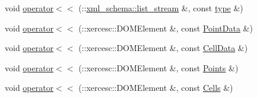 \begin{DoxyCompactItemize}
\item 
void \hyperlink{vtk-unstructured_8h_a592b2e850332ad8580bb7fbdbdf3405b}{operator$<$$<$} (\-::\hyperlink{namespacexml__schema_ab6c818ac91e70a25620375e0d000be83}{xml\-\_\-schema\-::list\-\_\-stream} \&, const \hyperlink{classtype}{type} \&)
\item 
void \hyperlink{vtk-unstructured_8h_adcc12b50e7eec96e51069960ff490aec}{operator$<$$<$} (\-::xercesc\-::\-D\-O\-M\-Element \&, const \hyperlink{classPointData}{Point\-Data} \&)
\item 
void \hyperlink{vtk-unstructured_8h_ad7d5540bd93e9ed92be18cb521501e0a}{operator$<$$<$} (\-::xercesc\-::\-D\-O\-M\-Element \&, const \hyperlink{classCellData}{Cell\-Data} \&)
\item 
void \hyperlink{vtk-unstructured_8h_ad157bfbf3a7da32268c50c8133d349f7}{operator$<$$<$} (\-::xercesc\-::\-D\-O\-M\-Element \&, const \hyperlink{classPoints}{Points} \&)
\item 
void \hyperlink{vtk-unstructured_8h_a71c62a435e60069931c8d51f1eaed6db}{operator$<$$<$} (\-::xercesc\-::\-D\-O\-M\-Element \&, const \hyperlink{classCells}{Cells} \&)
\end{DoxyCompactItemize}
